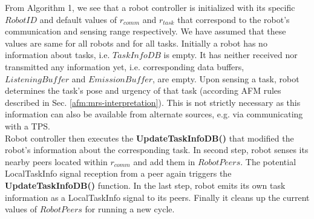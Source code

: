 From Algorithm 1, we see that a robot controller is initialized with its specific $RobotID$ and default values of $r_{comm}$ and $r_{task}$ that correspond to the robot's communication and sensing range respectively. We have assumed that these values are same for all robots and for all tasks. Initially a robot has no information about tasks, i.e. {$TaskInfoDB$} is empty. It has neither received nor transmitted any information yet, i.e. corresponding data buffers, $ListeningBuffer$ and $EmissionBuffer$, are empty. Upon sensing a task, robot determines the task's pose and urgency of that task (according AFM rules described in Sec. \ref{afm:mrs-interpretation}). This is not strictly necessary as this information can also be available from alternate sources, e.g. via communicating with a TPS.\\
Robot controller then executes the \textbf{UpdateTaskInfoDB()} that modified the robot's information about the corresponding task. In second step, robot senses its nearby peers located within $r_{comm}$ and add them in $RobotPeers$. The potential LocalTaskInfo signal reception from a  peer again triggers the \textbf{UpdateTaskInfoDB()} function. In the last step, robot emits its own task information as a LocalTaskInfo  signal to its peers. Finally it cleans up the current values of $RobotPeers$ for running a new cycle.
%
